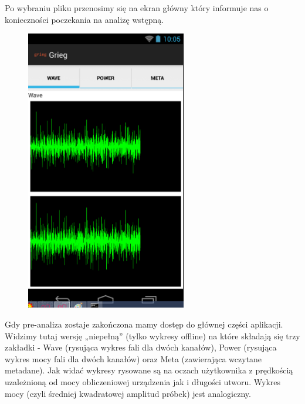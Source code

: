 Po wybraniu pliku przenosimy się na ekran główny który informuje nas o konieczności poczekania na
analizę wstępną.

\begin{figure}[H]
  \centering
  \includegraphics[width=7cm]{images/offline_wave_incomplete}
\end{figure}

Gdy pre-analiza zostaje zakończona mamy dostęp do głównej części aplikacji. Widzimy tutaj wersję
„niepełną” (tylko wykresy offline) na które składają się trzy zakładki - Wave (rysująca wykres fali
dla dwóch kanałów), Power (rysująca wykres mocy fali dla dwóch kanałów) oraz Meta (zawierająca
wczytane metadane). Jak widać wykresy rysowane są na oczach użytkownika z prędkością uzależnioną od
mocy obliczeniowej urządzenia jak i długości utworu. Wykres mocy (czyli średniej kwadratowej
amplitud próbek) jest analogiczny.

